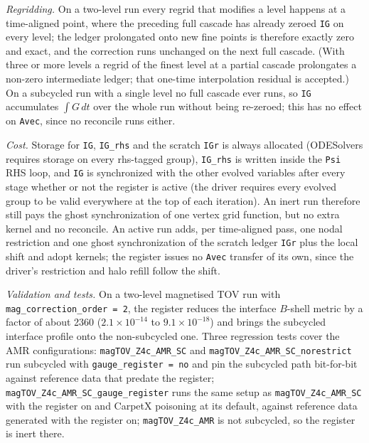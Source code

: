 \emph{Regridding.} On a two-level run every regrid that modifies a level
happens at a time-aligned point, where the preceding full cascade has already
zeroed \texttt{IG} on every level; the ledger prolongated onto new fine points
is therefore exactly zero and exact, and the correction runs unchanged on the
next full cascade. (With three or more levels a regrid of the finest level at
a partial cascade prolongates a non-zero intermediate ledger; that one-time
interpolation residual is accepted.) On a subcycled run with a single level no
full cascade ever runs, so \texttt{IG} accumulates $\int G\,dt$ over the whole
run without being re-zeroed; this has no effect on \texttt{Avec}, since no
reconcile runs either.

\emph{Cost.} Storage for \texttt{IG}, \texttt{IG\_rhs} and the scratch
\texttt{IGr} is always allocated (ODESolvers requires storage on every
rhs-tagged group), \texttt{IG\_rhs} is written inside the \texttt{Psi} RHS
loop, and \texttt{IG} is synchronized with the other evolved variables after
every stage whether or not the register is active (the driver requires every
evolved group to be valid everywhere at the top of each iteration). An inert
run therefore still pays the ghost synchronization of one vertex grid
function, but no extra kernel and no reconcile. An active run adds, per
time-aligned pass, one nodal restriction and one ghost synchronization of the
scratch ledger \texttt{IGr} plus the local shift and adopt kernels; the
register issues no \texttt{Avec} transfer of its own, since the driver's
restriction and halo refill follow the shift.

\emph{Validation and tests.} On a two-level magnetised TOV run with
\texttt{mag\_correction\_order = 2}, the register reduces the interface
$B$-shell metric by a factor of about 2360 ($2.1\times10^{-14}$ to
$9.1\times10^{-18}$) and brings the subcycled interface profile onto the
non-subcycled one. Three regression tests cover the AMR configurations:
\texttt{magTOV\_Z4c\_AMR\_SC} and \texttt{magTOV\_Z4c\_AMR\_SC\_norestrict}
run subcycled with \texttt{gauge\_register = no} and pin the subcycled path
bit-for-bit against reference data that predate the register;
\texttt{magTOV\_Z4c\_AMR\_SC\_gauge\_register} runs the same setup as
\texttt{magTOV\_Z4c\_AMR\_SC} with the register on and CarpetX poisoning at
its default, against reference data generated with the register on;
\texttt{magTOV\_Z4c\_AMR} is not subcycled, so the register is inert there.

